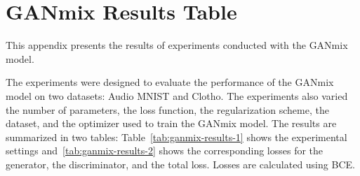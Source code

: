 \chapter{GANmix Results Table} \label{ann:ganmix-results}

This appendix presents the results of experiments conducted with the GANmix model.

The experiments were designed to evaluate the performance of the GANmix model on two datasets: Audio MNIST and Clotho. The experiments also varied the number of parameters, the loss function, the regularization scheme, the dataset, and the optimizer used to train the GANmix model. The results are summarized in two tables: Table~\ref{tab:ganmix-results-1} shows the experimental settings and~\ref{tab:ganmix-results-2} shows the corresponding losses for the generator, the discriminator, and the total loss. Losses are calculated using \ac{BCE}.

